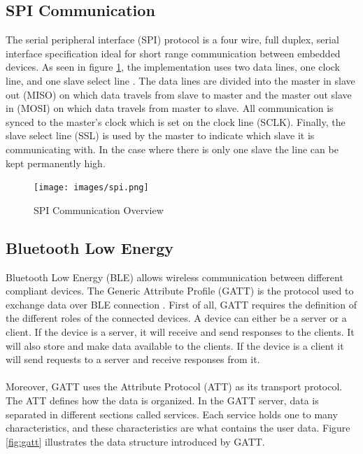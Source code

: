 \documentclass[12pt]{article}
\begin{document}
\subsection{SPI Communication}
The serial peripheral interface (SPI) protocol is a four wire, full duplex, serial interface specification ideal for short range communication between embedded devices. As seen in figure \ref{fig:spi}, the implementation uses two data lines, one clock line, and one slave select line \cite{SPIprotocol}. The data lines are divided into the master in slave out (MISO) on which data travels from slave to master and the master out slave in (MOSI) on which data travels from master to slave. All communication is synced to the master's clock which is set on the clock line (SCLK). Finally, the slave select line (SSL) is used by the master to indicate which slave it is communicating with. In the case where there is only one slave the line can be kept permanently high.

\begin{figure}[!htb]
  \centering
  \texttt{[image: images/spi.png]}
  \caption{SPI Communication Overview}
  \label{fig:spi}
 \end{figure}

\subsection{Bluetooth Low Energy}
Bluetooth Low Energy (BLE) allows wireless communication between different compliant devices. The Generic Attribute Profile (GATT) is the protocol used to exchange data over BLE connection \cite{BLEGATT}. First of all, GATT requires the definition of the different roles of the connected devices. A device can either be a server or a client. If the device is a server, it will receive and send responses to the clients. It will also store and make data available to the clients. If the device is a client it will send requests to a server and receive responses from it.
\paragraph{}
Moreover, GATT uses the Attribute Protocol (ATT) as its transport protocol. The ATT defines how the data is organized. In the GATT server, data is separated in different sections called services. Each service holds one to many characteristics, and these characteristics are what contains the user data. Figure \ref{fig:gatt} illustrates the data structure introduced by GATT.
\end{document}
